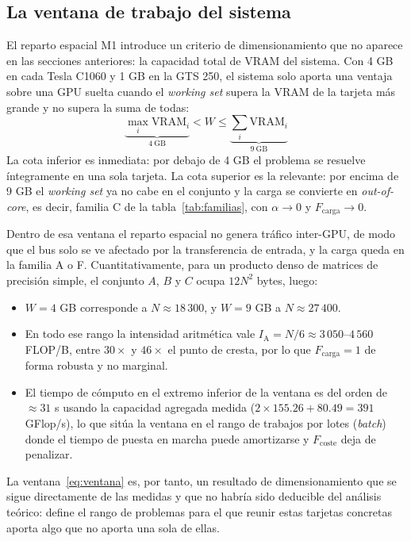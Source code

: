 \documentclass[a4paper,11pt]{article}
\begin{document}
\subsection*{La ventana de trabajo del sistema}

El reparto espacial M1 introduce un criterio de dimensionamiento que no aparece en las secciones anteriores: la capacidad total
de VRAM del sistema. Con 4 GB en cada Tesla C1060 y 1 GB en la GTS 250, el sistema solo aporta una ventaja sobre una GPU
suelta cuando el \emph{working set} supera la VRAM de la tarjeta más grande y no supera la suma de todas:
\begin{equation}\label{eq:ventana}
    \underbrace{\max_i \text{VRAM}_i}_{4\ \text{GB}} < W \le \underbrace{\sum_i \text{VRAM}_i}_{9\ \text{GB}}
\end{equation}
La cota inferior es inmediata: por debajo de 4 GB el problema se resuelve íntegramente en una sola tarjeta. La cota superior
es la relevante: por encima de 9 GB el \emph{working set} ya no cabe en el conjunto y la carga se convierte en \emph{out-of-core},
es decir, familia C de la tabla~\ref{tab:familias}, con $\alpha \to 0$ y $F_{\text{carga}} \to 0$.

Dentro de esa ventana el reparto espacial no genera tráfico inter-GPU, de modo que el bus solo se ve afectado por la transferencia
de entrada, y la carga queda en la familia A o F. Cuantitativamente, para un producto denso de matrices de precisión simple, el
conjunto $A$, $B$ y $C$ ocupa $12N^2$ bytes, luego:
\begin{itemize}[leftmargin=*,itemsep=2pt]
    \item $W = 4$ GB corresponde a $N \approx 18\,300$, y $W = 9$ GB a $N \approx 27\,400$.
    \item En todo ese rango la intensidad aritmética vale $I_{\text{A}} = N/6 \approx 3\,050$--$4\,560$ FLOP/B, entre $30\times$ y
    $46\times$ el punto de cresta, por lo que $F_{\text{carga}} = 1$ de forma robusta y no marginal.
    \item El tiempo de cómputo en el extremo inferior de la ventana es del orden de $\approx 31$ s usando la capacidad agregada
    medida ($2 \times 155.26 + 80.49 = 391$ GFlop/s), lo que sitúa la ventana en el rango de trabajos por lotes (\emph{batch})
    donde el tiempo de puesta en marcha puede amortizarse y $F_{\text{coste}}$ deja de penalizar.
\end{itemize}
La ventana~\eqref{eq:ventana} es, por tanto, un resultado de dimensionamiento que se sigue directamente de las medidas y que
no habría sido deducible del análisis teórico: define el rango de problemas para el que reunir estas tarjetas concretas aporta
algo que no aporta una sola de ellas.
\end{document}
